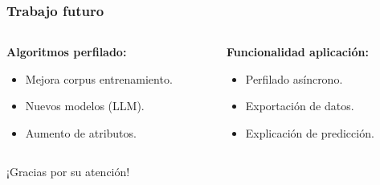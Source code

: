 \documentclass{beamer}
\begin{document}
	\begin{frame}
		\frametitle{Trabajo futuro}

		\begin{columns}[T]
				\hspace{-3cm}
			\begin{column}{0.8\textwidth}
				\begin{description}[labelwidth=0.01mm]
					\item \textbf{Algoritmos perfilado:}
					\begin{itemize}
						\item Mejora corpus entrenamiento. \pause
						\item Nuevos modelos (LLM). \pause
						\item Aumento de atributos.
						\end{itemize}
				\end{description}
			\end{column}
				\hspace{-3cm}
			\begin{column}{0.8\textwidth}

				\begin{description}[labelwidth=0.01mm]
					\item \textbf{Funcionalidad aplicación:}
					\begin{itemize}
						\item Perfilado asíncrono. \pause
						\item Exportación de datos.\pause
						\item Explicación de predicción.
					\end{itemize}
				\end{description}
			\end{column}
		\end{columns}
	\end{frame}
	
\begin{frame}[plain]
	\begin{center}
		\Huge ¡Gracias por su atención!
	\end{center}
\end{frame}
\end{document}
